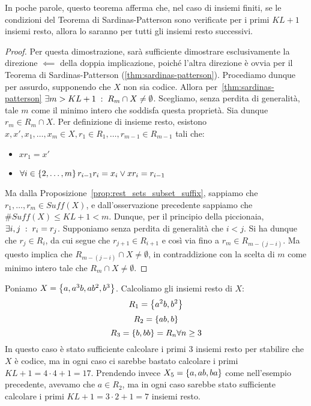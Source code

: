 In poche parole, questo teorema afferma che, nel caso di insiemi finiti, se le condizioni del Teorema di Sardinas-Patterson sono verificate per i primi \(KL+1\) insiemi resto, allora lo saranno per tutti gli insiemi resto successivi.

\begin{proof}
  Per questa dimostrazione, sarà sufficiente dimostrare esclusivamente la direzione \(\impliedby\) della doppia implicazione, poiché l'altra direzione è ovvia per il Teorema di Sardinas-Patterson (\ref{thm:sardinas-patterson}).
  Procediamo dunque per assurdo, supponendo che \(X\) non sia codice. Allora per~\ref{thm:sardinas-patterson} \(\exists m > KL + 1 \;:\; R_m \cap X \neq \emptyset\).
  Scegliamo, senza perdita di generalità, tale \(m\) come il minimo intero che soddisfa questa proprietà.
  Sia dunque \(r_m \in R_m \cap X\). Per definizione di insieme resto, esistono \(x,x',x_1,\ldots,x_m \in X, r_1\in R_1,\ldots,r_{m-1} \in R_{m-1}\) tali che:
  \begin{itemize}
    \item \(xr_1=x'\) 
    \item \(\forall i \in \set{2,\ldots,m} r_{i-1}r_i=x_i \lor xr_i = r_{i-1}\)
  \end{itemize}
  Ma dalla Proposizione~\ref{prop:rest_sets_subset_suffix}, sappiamo che \(r_1,\ldots,r_m \in Suff(X)\), e dall'osservazione precedente sappiamo che \(\# Suff(X) \leq KL + 1 < m\).
  Dunque, per il principio della piccionaia, \(\exists i,j \;:\; r_i=r_j\). Supponiamo senza perdita di generalità che \(i<j\).
  Si ha dunque che \(r_j \in R_i\), da cui segue che \(r_{j+1} \in R_{i+1}\) e così via fino a \(r_m \in R_{m-(j-i)}\).
  Ma questo implica che \(R_{m-(j-i)} \cap X \neq \emptyset\), in contraddizione con la scelta di \(m\) come minimo intero tale che \(R_m \cap X \neq \emptyset\).
\end{proof}

\begin{example}
  Poniamo \(X = \set{a,a^3b,ab^2,b^3}\). Calcoliamo gli insiemi resto di \(X\):
  \[R_1 = \set{a^2b,b^2}\]
  \[R_2 = \set{ab,b}\]
  \[R_3 = \set{b,bb} = R_n \forall n \geq 3\]
  In questo caso è stato sufficiente calcolare i primi \(3\) insiemi resto per stabilire che \(X\) è codice, ma in ogni caso ci sarebbe bastato calcolare i primi \(KL+1 = 4\cdot 4 + 1 = 17\).
  Prendendo invece \(X_5 = \set{a,ab,ba}\) come nell'esempio precedente, avevamo che \(a \in R_2\), ma in ogni caso sarebbe stato sufficiente calcolare i primi \(KL+1 = 3\cdot 2 + 1 = 7\) insiemi resto.
\end{example}

